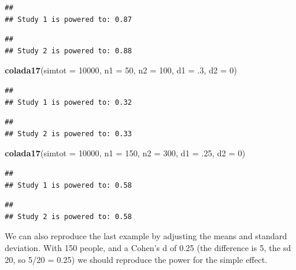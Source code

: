 \documentclass[
]{book}
\newenvironment{Shaded}{\begin{snugshade}}{\end{snugshade}}
\newcommand{\DataTypeTok}[1]{\textcolor[rgb]{0.13,0.29,0.53}{#1}}
\newcommand{\DecValTok}[1]{\textcolor[rgb]{0.00,0.00,0.81}{#1}}
\newcommand{\FloatTok}[1]{\textcolor[rgb]{0.00,0.00,0.81}{#1}}
\newcommand{\KeywordTok}[1]{\textcolor[rgb]{0.13,0.29,0.53}{\textbf{#1}}}
\newcommand{\NormalTok}[1]{#1}
\begin{document}
\begin{verbatim}
## 
## Study 1 is powered to: 0.87
\end{verbatim}

\begin{verbatim}
## 
## Study 2 is powered to: 0.88
\end{verbatim}

\begin{Shaded}
\begin{Highlighting}[]
\KeywordTok{colada17}\NormalTok{(}\DataTypeTok{simtot =} \DecValTok{10000}\NormalTok{, }\DataTypeTok{n1 =} \DecValTok{50}\NormalTok{, }\DataTypeTok{n2 =} \DecValTok{100}\NormalTok{, }\DataTypeTok{d1 =} \FloatTok{.3}\NormalTok{, }\DataTypeTok{d2 =} \DecValTok{0}\NormalTok{)}
\end{Highlighting}
\end{Shaded}

\begin{verbatim}
## 
## Study 1 is powered to: 0.32
\end{verbatim}

\begin{verbatim}
## 
## Study 2 is powered to: 0.33
\end{verbatim}

\begin{Shaded}
\begin{Highlighting}[]
\KeywordTok{colada17}\NormalTok{(}\DataTypeTok{simtot =} \DecValTok{10000}\NormalTok{, }\DataTypeTok{n1 =} \DecValTok{150}\NormalTok{, }\DataTypeTok{n2 =} \DecValTok{300}\NormalTok{, }\DataTypeTok{d1 =} \FloatTok{.25}\NormalTok{, }\DataTypeTok{d2 =} \DecValTok{0}\NormalTok{)}
\end{Highlighting}
\end{Shaded}

\begin{verbatim}
## 
## Study 1 is powered to: 0.58
\end{verbatim}

\begin{verbatim}
## 
## Study 2 is powered to: 0.58
\end{verbatim}

We can also reproduce the last example by adjusting the means and standard deviation. With 150 people, and a Cohen's d of 0.25 (the difference is 5, the sd 20, so 5/20 = 0.25) we should reproduce the power for the simple effect.
\end{document}
